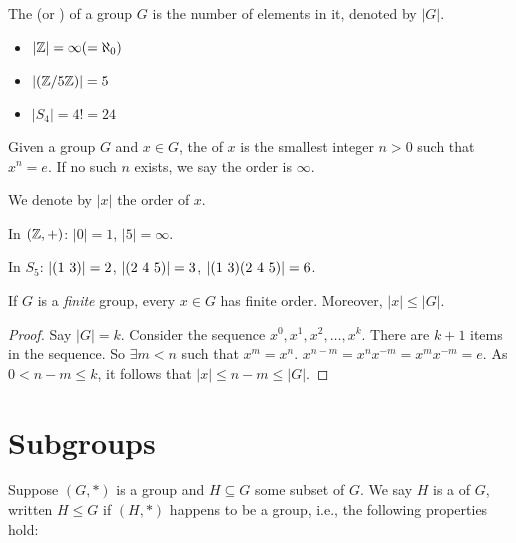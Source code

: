 \documentclass[notes.tex]{subfiles}
\begin{document}

\begin{definition}
	The  (or ) of a group $G$ is the number of elements in it, denoted by $|G|$.
\end{definition}

\begin{eg}\leavevmode
	\begin{itemize}
		\item  $|\mathbb{Z}| = \infty (= \aleph_0)$
		\item $|(\mathbb{Z}/5\mathbb{Z})| = 5$
		\item $|S_4| = 4! = 24$
	\end{itemize}
\end{eg}


\begin{definition}
	Given a group $G$ and $x\in G$, the  of $x$ is the smallest integer $n>0$ such that $x^n=e$. If no such $n$ exists, we say the order is $\infty$.

	We denote by $|x|$ the order of $x$.
\end{definition}

\begin{eg}
	In $(\mathbb{Z}, +)$:
	$|0| = 1$, $|5| = \infty$.

	In $S_5$:
	$|\text{(1 3)}| = 2$, $|\text{(2 4 5)}| = 3$, $|\text{(1 3)}\text{(2 4 5)}| = 6$.
\end{eg}

\begin{proposition}
	If $G$ is a \emph{finite}  group, every $x\in G$ has finite order.
	Moreover, $|x| \le |G|$.
\end{proposition}
\begin{proof}
	Say $|G| = k$. Consider the sequence $x^0, x^1, x^2, \ldots, x^k$.
	There are $k+1$ items in the sequence. So $\exists m < n$ such that $x^m=x^n$.
		$x^{n-m} = x^nx^{-m} = x^mx^{-m} = e$.
		As $0 < n-m \le k$, it follows that $|x|\le n-m \le |G|$.
\end{proof}

\chapter*{Subgroups} %
\label{ssub:subgroups}
\begin{definition}
	Suppose $(G, *)$ is a group and $H\subseteq G$ some subset of $G$. 
	We say $H$ is a  of $G$, written $H\le G$ if $(H, *)$ happens to be a group, i.e., the following properties hold:
\end{definition}
\end{document}
